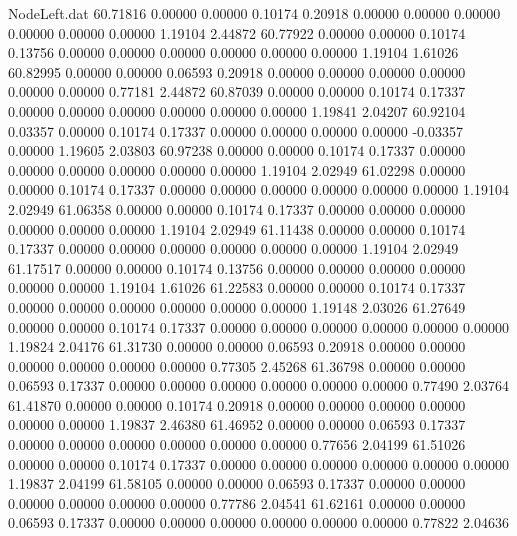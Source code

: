 \begin{filecontents}{NodeLeft.dat}
  60.71816    0.00000    0.00000     0.10174    0.20918    0.00000    0.00000    0.00000    0.00000    0.00000    0.00000    1.19104    2.44872
  60.77922    0.00000    0.00000     0.10174    0.13756    0.00000    0.00000    0.00000    0.00000    0.00000    0.00000    1.19104    1.61026
  60.82995    0.00000    0.00000     0.06593    0.20918    0.00000    0.00000    0.00000    0.00000    0.00000    0.00000    0.77181    2.44872
  60.87039    0.00000    0.00000     0.10174    0.17337    0.00000    0.00000    0.00000    0.00000    0.00000    0.00000    1.19841    2.04207
  60.92104    0.03357    0.00000     0.10174    0.17337    0.00000    0.00000    0.00000    0.00000   -0.03357    0.00000    1.19605    2.03803
  60.97238    0.00000    0.00000     0.10174    0.17337    0.00000    0.00000    0.00000    0.00000    0.00000    0.00000    1.19104    2.02949
  61.02298    0.00000    0.00000     0.10174    0.17337    0.00000    0.00000    0.00000    0.00000    0.00000    0.00000    1.19104    2.02949
  61.06358    0.00000    0.00000     0.10174    0.17337    0.00000    0.00000    0.00000    0.00000    0.00000    0.00000    1.19104    2.02949
  61.11438    0.00000    0.00000     0.10174    0.17337    0.00000    0.00000    0.00000    0.00000    0.00000    0.00000    1.19104    2.02949
  61.17517    0.00000    0.00000     0.10174    0.13756    0.00000    0.00000    0.00000    0.00000    0.00000    0.00000    1.19104    1.61026
  61.22583    0.00000    0.00000     0.10174    0.17337    0.00000    0.00000    0.00000    0.00000    0.00000    0.00000    1.19148    2.03026
  61.27649    0.00000    0.00000     0.10174    0.17337    0.00000    0.00000    0.00000    0.00000    0.00000    0.00000    1.19824    2.04176
  61.31730    0.00000    0.00000     0.06593    0.20918    0.00000    0.00000    0.00000    0.00000    0.00000    0.00000    0.77305    2.45268
  61.36798    0.00000    0.00000     0.06593    0.17337    0.00000    0.00000    0.00000    0.00000    0.00000    0.00000    0.77490    2.03764
  61.41870    0.00000    0.00000     0.10174    0.20918    0.00000    0.00000    0.00000    0.00000    0.00000    0.00000    1.19837    2.46380
  61.46952    0.00000    0.00000     0.06593    0.17337    0.00000    0.00000    0.00000    0.00000    0.00000    0.00000    0.77656    2.04199
  61.51026    0.00000    0.00000     0.10174    0.17337    0.00000    0.00000    0.00000    0.00000    0.00000    0.00000    1.19837    2.04199
  61.58105    0.00000    0.00000     0.06593    0.17337    0.00000    0.00000    0.00000    0.00000    0.00000    0.00000    0.77786    2.04541
  61.62161    0.00000    0.00000     0.06593    0.17337    0.00000    0.00000    0.00000    0.00000    0.00000    0.00000    0.77822    2.04636

\end{filecontents}
